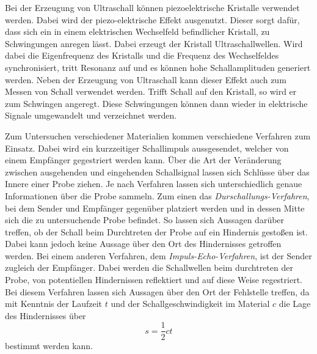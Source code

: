 Bei der Erzeugung von Ultraschall können piezoelektrische Kristalle verwendet werden. Dabei wird der piezo-elektrische Effekt ausgenutzt. Dieser sorgt dafür, dass sich ein in einem elektrischen Wechselfeld befindlicher Kristall, zu Schwingungen anregen lässt. Dabei erzeugt der Kristall Ultraschallwellen. Wird dabei die Eigenfrequenz des Kristalls und die Frequenz des Wechselfeldes synchronisiert, tritt Resonanz auf und es können hohe Schallamplituden generiert werden. Neben der Erzeugung von Ultraschall kann dieser Effekt auch zum Messen von Schall verwendet werden. Trifft Schall auf den Kristall, so wird er zum Schwingen angeregt. Diese Schwingungen können dann wieder in elektrische Signale umgewandelt und verzeichnet werden.

Zum Untersuchen verschiedener Materialien kommen verschiedene Verfahren zum Einsatz. Dabei wird ein kurzzeitiger Schallimpuls aussgesendet, welcher von einem Empfänger gegestriert werden kann. Über die Art der Veränderung zwischen ausgehenden und eingehenden Schallsignal lassen sich Schlüsse über das Innere einer Probe ziehen. Je nach Verfahren lassen sich unterschiedlich genaue Informationen über die Probe sammeln. Zum einen das \textit{Durschallungs-Verfahren}, bei dem Sender und Empfänger gegenüber platziert werden und in dessen Mitte sich die zu untersuchende Probe befindet. So lassen sich Aussagen darüber treffen, ob der Schall beim Durchtreten der Probe auf ein Hindernis gestoßen ist. Dabei kann jedoch keine Aussage über den Ort des Hindernisses getroffen werden. 
Bei einem anderen Verfahren, dem \textit{Impuls-Echo-Verfahren}, ist der Sender zugleich der Empfänger. Dabei werden die Schallwellen beim durchtreten der Probe, von potentiellen Hindernissen reflektiert und auf diese Weise regestriert. Bei diesem Verfahren lassen sich Aussagen über den Ort der Fehlstelle treffen, da mit Kenntnis der Laufzeit $t$ und der Schallgeschwindigkeit im Material $c$ die Lage des Hindernisses über
\begin{equation}
    s=\frac{1}{2}ct
\end{equation}
bestimmt werden kann.






